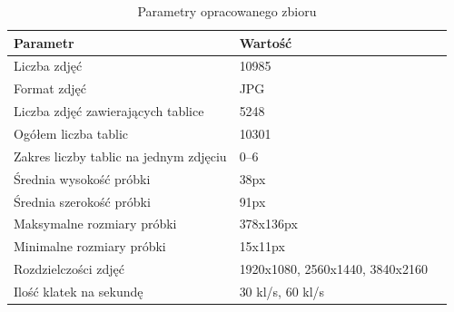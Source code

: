 \begin{table}[h]
    \centering
    \caption{Parametry opracowanego zbioru}
    \begin{tabular}{l l l}
        \toprule
        \textbf{Parametr}                      & \textbf{Wartość}                \\
        \midrule
        Liczba zdjęć                           & 10985                           \\
        Format zdjęć                           & JPG                             \\
        Liczba zdjęć zawierających tablice     & 5248                            \\
        Ogółem liczba tablic                   & 10301                           \\
        Zakres liczby tablic na jednym zdjęciu & 0--6                            \\
        Średnia wysokość próbki                & 38px                            \\
        Średnia szerokość próbki               & 91px                            \\
        Maksymalne rozmiary próbki             & 378x136px                       \\
        Minimalne rozmiary próbki              & 15x11px                         \\
        Rozdzielczości zdjęć                   & 1920x1080, 2560x1440, 3840x2160 \\
        Ilość klatek na sekundę                & 30 kl/s, 60 kl/s                \\
        \bottomrule
    \end{tabular}
    \label{tab:tab_data_set_characteristics}
\end{table}